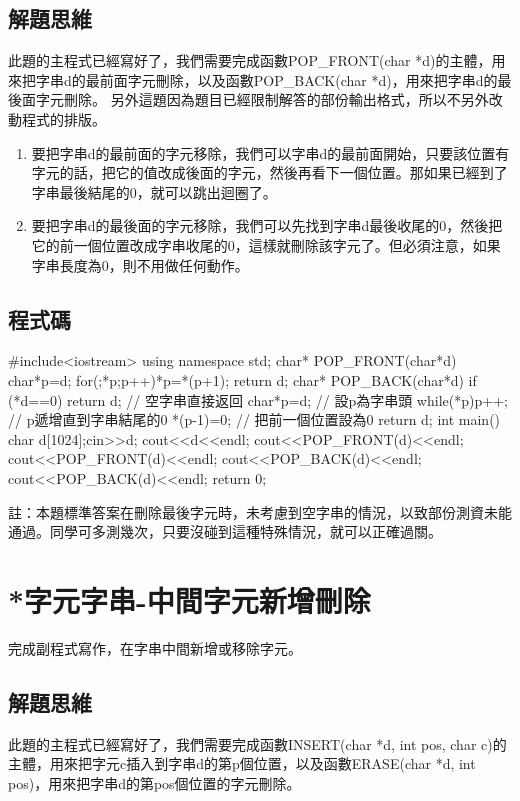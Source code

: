 \subsection{解題思維}
此題的主程式已經寫好了，我們需要完成函數POP\_FRONT(char *d)的主體，用來把字串d的最前面字元刪除，以及函數POP\_BACK(char *d)，用來把字串d的最後面字元刪除。
另外這題因為題目已經限制解答的部份輸出格式，所以不另外改動程式的排版。

\vspace{0.3cm}
\begin{enumerate}
	\item 要把字串d的最前面的字元移除，我們可以字串d的最前面開始，只要該位置有字元的話，把它的值改成後面的字元，然後再看下一個位置。那如果已經到了字串最後結尾的0，就可以跳出迴圈了。
	\item 要把字串d的最後面的字元移除，我們可以先找到字串d最後收尾的0，然後把它的前一個位置改成字串收尾的0，這樣就刪除該字元了。但必須注意，如果字串長度為0，則不用做任何動作。
\end{enumerate}

\subsection{程式碼}
\begin{cppcode}
#include<iostream>
using namespace std; 
char* POP_FRONT(char*d){
	char*p=d;
	for(;*p;p++)*p=*(p+1);
	return d;
}
char* POP_BACK(char*d){
	if (*d==0) return d; // 空字串直接返回
	char*p=d; // 設p為字串頭
	while(*p)p++; // p遞增直到字串結尾的0
	*(p-1)=0; // 把前一個位置設為0
	return d;
}
int main(){ 
	char d[1024];cin>>d;
	cout<<d<<endl;
	cout<<POP_FRONT(d)<<endl;
	cout<<POP_FRONT(d)<<endl;
	cout<<POP_BACK(d)<<endl;
	cout<<POP_BACK(d)<<endl;
	return 0;
} 
\end{cppcode}

註：本題標準答案在刪除最後字元時，未考慮到空字串的情況，以致部份測資未能通過。同學可多測幾次，只要沒碰到這種特殊情況，就可以正確過關。


\section{*字元字串-中間字元新增刪除}
完成副程式寫作，在字串中間新增或移除字元。

\subsection{解題思維}
此題的主程式已經寫好了，我們需要完成函數INSERT(char *d, int pos, char c)的主體，用來把字元c插入到字串d的第p個位置，以及函數ERASE(char *d, int pos)，用來把字串d的第pos個位置的字元刪除。

